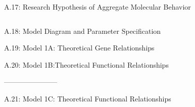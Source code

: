 \documentclass[final]{beamer}
\newlength{\onecolwid}
\newlength{\twocolwid}
\theoremstyle{definition}
\begin{document}
\begin{frame}[t]
\begin{columns}[t]
\begin{column}{\twocolwid}
\begin{alertblock}{A.17: Research Hypothesis of Aggregate Molecular Behavior}


\end{alertblock} 


\begin{columns}[t,totalwidth=\twocolwid] %
\begin{column}{\onecolwid} %

\begin{alertblock}{A.18: Model Diagram and Parameter Specification}

\end{alertblock}


\begin{alertblock}{A.19: Model 1A: Theoretical  Gene Relationships}

\end{alertblock}
\begin{alertblock}{A.20: Model 1B:Theoretical Functional Relationships}

\end{alertblock}

-----------------------
\begin{alertblock}{A.21: Model 1C: Theoretical Functional Relationships}
	
\end{alertblock}
\end{column} %



\end{columns}
\end{column}
\end{columns}
\end{frame}
\end{document}
